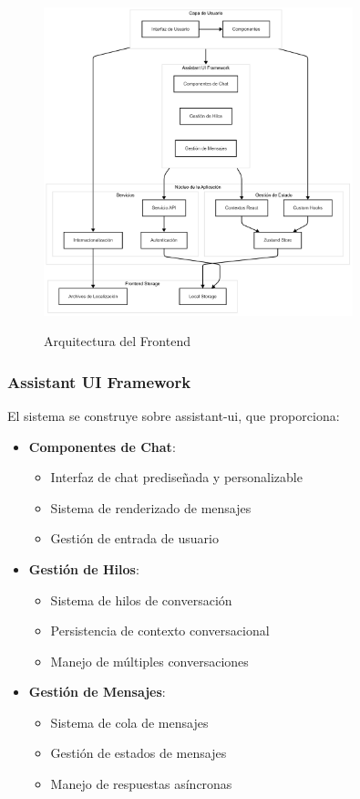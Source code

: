 \begin{figure}[H]
	\centering
	\includegraphics[width=0.8\textwidth]{figuras/frontend.png}
	\label{fig:arquitectura-frontend}
	\caption{Arquitectura del Frontend}
\end{figure}

\subsubsection{Assistant UI Framework}
\label{assistant-ui}

El sistema se construye sobre \gls{assistant-ui}, que proporciona:

\begin{itemize}
	\item \textbf{Componentes de Chat}:
	      \begin{itemize}
		      \item Interfaz de chat prediseñada y personalizable
		      \item Sistema de renderizado de mensajes
		      \item Gestión de entrada de usuario
	      \end{itemize}

	\item \textbf{Gestión de Hilos}:
	      \begin{itemize}
		      \item Sistema de hilos de conversación
		      \item Persistencia de contexto conversacional
		      \item Manejo de múltiples conversaciones
	      \end{itemize}

	\item \textbf{Gestión de Mensajes}:
	      \begin{itemize}
		      \item Sistema de cola de mensajes
		      \item Gestión de estados de mensajes
		      \item Manejo de respuestas asíncronas
	      \end{itemize}
\end{itemize}
